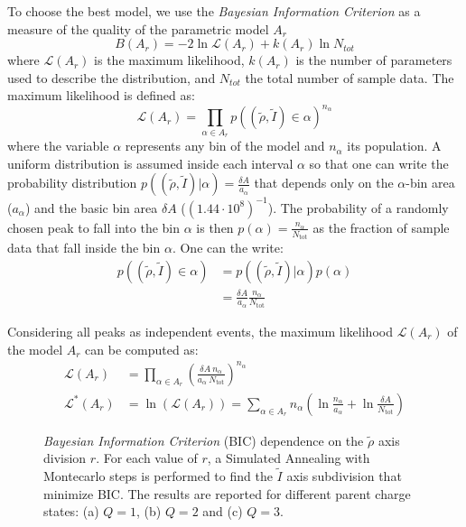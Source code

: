 To choose the best model, we use the \emph{Bayesian
Information Criterion} as
a measure of the quality of the parametric model $A_r$ 
\begin{equation}
B(A_r) = -2\ln \mathcal{L}(A_r) + k(A_r)\ln N_{tot}
\end{equation}
where $\mathcal L(A_r)$ is the maximum likelihood, $k(A_r)$ is the number of
parameters used to describe the distribution, and $N_{tot}$ the total number of
sample data.
The maximum likelihood is defined as:
\begin{equation}
\mathcal L(A_r) = \prod_{\alpha\in A_r} p((\tilde\rho,\tilde I)\in
\alpha)^{n_\alpha}
\end{equation}
where the variable $\alpha$ represents any bin of the model and $n_\alpha$ its
population.
A uniform distribution is assumed inside each interval $\alpha$ so that one can
write the probability distribution $p((\tilde\rho,\tilde I)|\alpha)=\frac{\delta
A}{a_\alpha}$ that depends only on the $\alpha$-bin area ($a_\alpha$) and the
basic bin area $\delta A$ ($(1.44\cdot10^8)^{-1}$).
The probability of a randomly chosen peak to fall into the bin $\alpha$ is then
$p(\alpha)=\frac{n_\alpha}{N_\textrm{tot}}$ as the fraction of sample data that
fall inside the bin $\alpha$.
One can the write:
\begin{align}
 p((\tilde\rho,\tilde I)\in \alpha) &= p((\tilde\rho,\tilde I) |\alpha)p(\alpha)\\
 &= \frac{\delta A}{a_\alpha}\frac{n_\alpha}{N_\textrm{tot}}
\end{align}

Considering all peaks as independent events, the maximum likelihood $\mathcal
L(A_r)$ of the model $A_r$ can be computed as:
\begin{align}
 \mathcal{L}(A_r)&=\prod_{\alpha\in A_r} 
\left(\frac{\delta A \ n_\alpha}{a_\alpha\ N_\textrm{tot}}\right)^{n_\alpha} \\
 \mathcal{L}^*(A_r) &= \ln (\mathcal L (A_r))= 
 \sum_{\alpha\in A_r} n_\alpha
\left(\ln\frac{n_\alpha}{a_\alpha}+\ln\frac{\delta A}{N_\textrm{tot}}\right)
\end{align}

\begin{figure}[!thb]
\begin{center}
\resizebox{0.7\textwidth}{!}{\sffamily}
\caption{\label{fig:bic}
\emph{Bayesian Information Criterion} (BIC) dependence on the $\tilde\rho$ axis
division $r$. For each value of $r$, a Simulated Annealing
with Montecarlo steps is performed to find the $\tilde I$ axis subdivision that
minimize BIC. The results are reported for different parent charge states: (a)
$Q=1$, (b) $Q=2$ and (c) $Q=3$.}
\end{center}
\end{figure}


